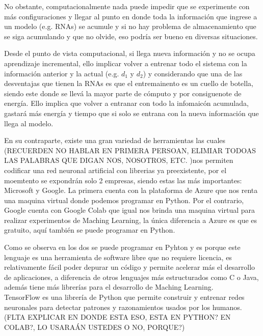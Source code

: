 No obstante,  computacionalmente nada puede 
        impedir que se experimente con más configuraciones y llegar al punto en donde toda la información 
        que ingrese a un modelo (e.g. RNAs) se acumule y si no hay problema de almacenamiento que se siga acumulando y que no olvide, 
        eso podría ser bueno en diversas situaciones.

Desde el punto de vista computacional, si llega nueva información y no se ocupa aprendizaje incremental, ello implicar volver a entrenar todo el sistema con la información anterior y la actual (e.g. $d_{1}$ y $d_{2}$) y considerando que una de las desventajas que tienen la RNAs es que el entremainento es un cuello de botella, siendo este donde se llevá la mayor parte de cómputo y por consiguenote de energía. Ello implica que volver a entranar con todo la infomaicón acumulada, gastará más energía y tiempo que si solo se entrana con la nueva información que llega al modelo.

 En su contraparte,  existe una gran variedad de herramientas las cuales (RECUERDEN NO HABLAR EN PRIMERA PERSOAN, ELIMIAR TODOAS LAS PALABRAS QUE DIGAN NOS, NOSOTROS, ETC. )nos permiten codificar una red neuronal artificial con librerias ya preexistente, por el moemtento se expondrán solo 2 empresas, siendo estas las más 
        importantes: Microsoft y Google. La primera cuenta con la plataforma de Azure que nos renta una maquina virtual donde podemos 
        programar en Python.  Por el contrario, Google cuenta con Google Colab que igual nos brinda una maquina virtual para realizar experimentos de Maching
        Learning, la \'unica diferencia a Azure es que es gratuito, aqu\'i también se puede programar en Python.

        Como se observa en los dos se puede programar en Pyhton y es porque este lenguaje es una herramienta de 
        software libre que no requiere licencia, es relativamente fácil poder depurar un código y permite acelerar 
        más el desarrollo de aplicaciones,  a diferencia de otros lenguajes más estructurados 
        como C o Java, adem\'as tiene m\'as librerías para el desarrollo de Maching Learning. \\

        TensorFlow es una librería de Python que permite construir y entrenar redes neuronales para detectar patrones y
        razonamientos usados por los humanos. (FLTA EXPLICAR EN DONDE ESTA ESO, ESTA EN PYTHON? EN COLAB?, LO USARAÁN USTEDES O NO, PORQUE?)\\ 

